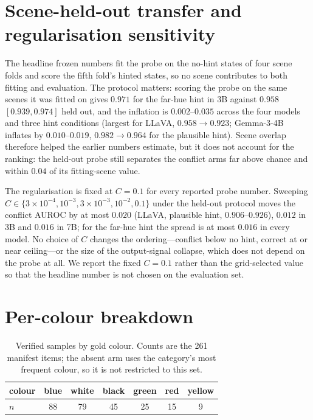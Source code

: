 \documentclass[10pt]{article}
\begin{document}
\section{Scene-held-out transfer and regularisation sensitivity}
\label{app:heldout}

The headline frozen numbers fit the probe on the no-hint states of four scene folds and score the fifth fold's hinted states, so no scene contributes to both fitting and evaluation. The protocol matters: scoring the probe on the same scenes it was fitted on gives $0.971$ for the far-hue hint in 3B against $0.958$ $[0.939,0.974]$ held out, and the inflation is $0.002$--$0.035$ across the four models and three hint conditions (largest for LLaVA, $0.958\to0.923$; Gemma-3-4B inflates by $0.010$--$0.019$, $0.982\to0.964$ for the plausible hint). Scene overlap therefore helped the earlier numbers estimate, but it does not account for the ranking: the held-out probe still separates the conflict arms far above chance and within $0.04$ of its fitting-scene value.

The regularisation is fixed at $C=0.1$ for every reported probe number. Sweeping $C\in\{3\times10^{-4},10^{-3},3\times10^{-3},10^{-2},0.1\}$ under the held-out protocol moves the conflict AUROC by at most $0.020$ (LLaVA, plausible hint, $0.906$--$0.926$), $0.012$ in 3B and $0.016$ in 7B; for the far-hue hint the spread is at most $0.016$ in every model. No choice of $C$ changes the ordering---conflict below no hint, correct at or near ceiling---or the size of the output-signal collapse, which does not depend on the probe at all. We report the fixed $C=0.1$ rather than the grid-selected value so that the headline number is not chosen on the evaluation set.

\section{Per-colour breakdown}
\label{app:colour}

\begin{table}[h]
\centering
\small
\caption{Verified samples by gold colour. Counts are the 261 manifest items; the absent arm uses the category's most frequent colour, so it is not restricted to this set.}
\begin{tabular}{lcccccc}
\toprule
colour & blue & white & black & green & red & yellow \\
\midrule
$n$ & 88 & 79 & 45 & 25 & 15 & 9 \\
\bottomrule
\end{tabular}
\end{table}
\end{document}
